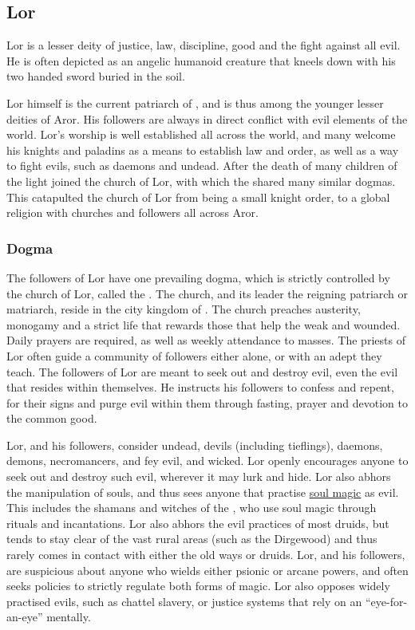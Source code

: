 \subsection{Lor}
\label{sec:Lor}

Lor is a lesser deity of justice, law, discipline, good and the fight against
all evil. He is often depicted as an angelic humanoid creature that kneels
down with his two handed sword buried in the soil.

Lor himself is the current patriarch of , and is thus
among the younger lesser deities of Aror. His followers are always in direct
conflict with evil elements of the world. Lor's worship is well established
all across the world, and many welcome his knights and paladins as a means to
establish law and order, as well as a way to fight evils, such as daemons and
undead. After the death of  many children of the light
joined the church of Lor, with which the  shared
many similar dogmas. This catapulted the church of Lor from being a small
knight order, to a global religion with churches and followers all across
Aror.

\subsubsection{Dogma}

The followers of Lor have one prevailing dogma, which is strictly controlled
by the church of Lor, called the . The
church, and its leader the reigning patriarch or matriarch, reside in the city
kingdom of . The church preaches austerity, monogamy and
a strict life that rewards those that help the weak and wounded. Daily prayers
are required, as well as weekly attendance to masses. The priests of Lor often
guide a community of followers either alone, or with an adept they teach. The
followers of Lor are meant to seek out and destroy evil, even the evil that
resides within themselves. He instructs his followers to confess and repent,
for their signs and purge evil within them through fasting, prayer and devotion
to the common good.

Lor, and his followers, consider undead, devils (including tieflings), daemons,
demons, necromancers, and fey evil, and wicked. Lor openly encourages
anyone to seek out and destroy such evil, wherever it may lurk and hide. Lor
also abhors the manipulation of souls, and thus sees anyone that practise
\hyperref[sec:Soul Magic]{soul magic} as evil. This includes the shamans and
witches of the , who use soul magic through rituals and
incantations. Lor also abhors the evil practices of most druids, but tends to
stay clear of the vast rural areas (such as the Dirgewood) and thus rarely
comes in contact with either the old ways or druids. Lor, and his followers,
are suspicious about anyone who wields either psionic or arcane powers, and
often seeks policies to strictly regulate both forms of magic. Lor also opposes
widely practised evils, such as chattel slavery, or justice systems that rely
on an ``eye-for-an-eye'' mentally.

